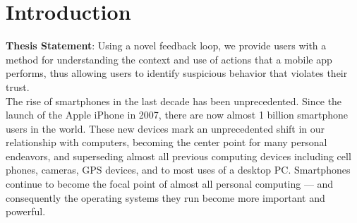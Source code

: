 \chapter{Introduction}
\label{sec:intro}

\textbf{Thesis Statement}: Using a novel feedback loop, we provide users with a method for understanding the context and use of actions that a mobile app performs, thus allowing users to identify suspicious behavior that violates their trust.\\


The rise of smartphones in the last decade has been unprecedented. Since the launch of the Apple iPhone in 2007, there are now almost 1 billion smartphone users in the world\citep{kpcbinternetreport2012}. These new devices mark an unprecedented shift in our relationship with computers, becoming the center point for many personal endeavors, and superseding almost all previous computing devices including cell phones, cameras, GPS devices, and to most uses of a desktop PC\citep{hua2012introduction}. Smartphones continue to become the focal point of almost all personal computing --- and consequently the operating systems they run become more important and powerful.

